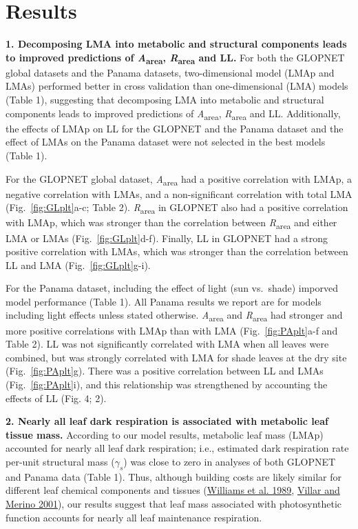 \documentclass[
  12pt,
  a4paper,
,tablecaptionabove
]{scrartcl}
\begin{document}
\hypertarget{results}{%
\section{Results}\label{results}}

\textbf{1. Decomposing LMA into metabolic and structural components leads to improved predictions of \emph{A}\textsubscript{area}, \emph{R}\textsubscript{area} and LL.}
For both the GLOPNET global datasets and the Panama datasets, two-dimensional model (LMAp and LMAs) performed better in cross validation than one-dimensional (LMA) models (Table 1), suggesting that decomposing LMA into metabolic and structural components leads to improved predictions of \emph{A}\textsubscript{area}, \emph{R}\textsubscript{area} and LL.
Additionally, the effects of LMAp on LL for the GLOPNET and the Panama dataset and the effect of LMAs on the Panama dataset were not selected in the best models (Table 1).

For the GLOPNET global dataset, \emph{A}\textsubscript{area} had a positive correlation with LMAp, a negative correlation with LMAs, and a non-significant correlation with total LMA (Fig.~\ref{fig:GLplt}a-c; Table 2).
\emph{R}\textsubscript{area} in GLOPNET also had a positive correlation with LMAp, which was stronger than the correlation between \emph{R}\textsubscript{area} and either LMA or LMAs (Fig.~\ref{fig:GLplt}d-f).
Finally, LL in GLOPNET had a strong positive correlation with LMAs, which was stronger than the correlation between LL and LMA (Fig.~\ref{fig:GLplt}g-i).

For the Panama dataset, including the effect of light (sun vs.~shade) imporved model performance (Table 1).
All Panama results we report are for models including light effects unless stated otherwise.
\emph{A}\textsubscript{area} and \emph{R}\textsubscript{area} had stronger and more positive correlations with LMAp than with LMA (Fig.~\ref{fig:PAplt}a-f and Table 2).
LL was not significantly correlated with LMA when all leaves were combined, but was strongly correlated with LMA for shade leaves at the dry site (Fig.~\ref{fig:PAplt}g).
There was a positive correlation between LL and LMAs (Fig.~\ref{fig:PAplt}i), and this relationship was strengthened by accounting the effects of LL (Fig. 4; 2).

\textbf{2. Nearly all leaf dark respiration is associated with metabolic leaf tissue mass.}
According to our model results, metabolic leaf mass (LMAp) accounted for nearly all leaf dark respiration; i.e., estimated dark respiration rate per-unit structural mass (\(\gamma_s\)) was close to zero in analyses of both GLOPNET and Panama data (Table 1).
Thus, although building costs are likely similar for different leaf chemical components and tissues (\protect\hyperlink{ref-Williams1989}{Williams et al. 1989}, \protect\hyperlink{ref-Villar2001}{Villar and Merino 2001}), our results suggest that leaf mass associated with photosynthetic function accounts for nearly all leaf maintenance respiration.
\end{document}
